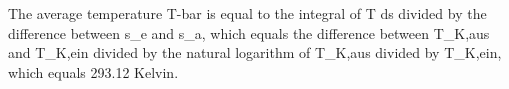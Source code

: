 The average temperature T-bar is equal to the integral of T ds divided by the difference between s_e and s_a, which equals the difference between T_K,aus and T_K,ein divided by the natural logarithm of T_K,aus divided by T_K,ein, which equals 293.12 Kelvin.